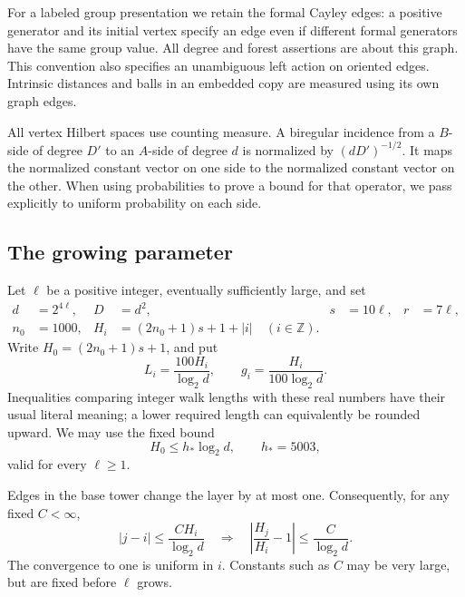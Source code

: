 For a labeled group presentation we retain the formal Cayley
edges: a positive generator and its initial vertex specify an
edge even if different formal generators have the same group
value. All degree and forest assertions are about this graph.
This convention also specifies an unambiguous left action on
oriented edges. Intrinsic distances and balls in an embedded
copy are measured using its own graph edges.

All vertex Hilbert spaces use counting measure.
A biregular incidence from a \(B\)-side of degree \(D'\) to an
\(A\)-side of degree \(d\) is normalized by
\((dD')^{-1/2}\). It maps the normalized constant vector on
one side to the normalized constant vector on the other.
When using probabilities to prove a bound for that operator,
we pass explicitly to uniform probability on each side.

\subsection{The growing parameter}

Let \(\ell\) be a positive integer, eventually sufficiently large,
and set
\begin{equation}
\begin{aligned}
 d&=2^{4\ell},& D&=d^2,& s&=10\ell,& r&=7\ell,\\
 n_0&=1000,&
 H_i&=(2n_0+1)s+1+|i| \quad(i\in\mathbb Z).
\end{aligned}
\label{setup:parameters}
\end{equation}
Write \(H_0=(2n_0+1)s+1\), and put
\begin{equation}
 L_i=\frac{100H_i}{\log_2d},\qquad
 g_i=\frac{H_i}{100\log_2d}.
 \label{setup:lengths}
\end{equation}
Inequalities comparing integer walk lengths with these real
numbers have their usual literal meaning; a lower required
length can equivalently be rounded upward.
We may use the fixed bound
\begin{equation}
 H_0\le h_*\log_2d,\qquad h_*=5003,
 \label{setup:hstar}
\end{equation}
valid for every \(\ell\ge1\).

Edges in the base tower change the layer by at most one.
Consequently, for any fixed \(C<\infty\),
\begin{equation}
 |j-i|\le \frac{CH_i}{\log_2d}
 \quad\Longrightarrow\quad
 \left|\frac{H_j}{H_i}-1\right|
 \le\frac{C}{\log_2d}.
 \label{setup:nearby}
\end{equation}
The convergence to one is uniform in \(i\). Constants such as
\(C\) may be very large, but are fixed before \(\ell\) grows.

